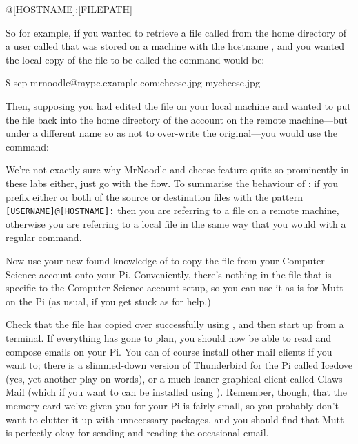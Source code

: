 \begin{ttoutenv}
[USERNAME]@[HOSTNAME]:[FILEPATH]
\end{ttoutenv}

So for example, if you wanted to retrieve a file called  from the home directory of a user called  that was stored on a machine with the hostname , and you wanted the local copy of the file to be called  the command would be:

\begin{ttoutenv}
\$ scp mrnoodle@mypc.example.com:cheese.jpg mycheese.jpg
\end{ttoutenv}

Then, supposing you had edited the file  on your local machine and wanted to put the file back into the home directory of the  account on the remote machine---but under a different name so as not to over-write the original---you would use the command:


We're not exactly sure why MrNoodle and cheese feature quite so prominently in these labs either, just go with the flow. To summarise the behaviour of : if you prefix either or both of the source or destination files with the pattern \verb|[USERNAME]@[HOSTNAME]:| then you are referring to a file on a remote machine, otherwise you are referring to a local file in the same way that you would with a regular  command.

Now use your new-found knowledge of  to copy the  file from your Computer Science account onto your Pi. Conveniently, there's nothing in the  file that is specific to the Computer Science account setup, so you can use it as-is for Mutt on the Pi (as usual, if you get stuck as for help.)

Check that the file has copied over successfully using , and then start up  from a terminal. If everything has gone to plan, you should now be able to read and compose emails on your Pi. You can of course install other mail clients if you want to; there is a slimmed-down version of Thunderbird for the Pi called Icedove (yes, yet another play on words), or a much leaner graphical client called Claws Mail (which if you want to can be installed using ). Remember, though, that the memory-card we've given you for your Pi is fairly small, so you probably don't want to clutter it up with unnecessary packages, and you should find that Mutt is perfectly okay for sending and reading the occasional email. 

